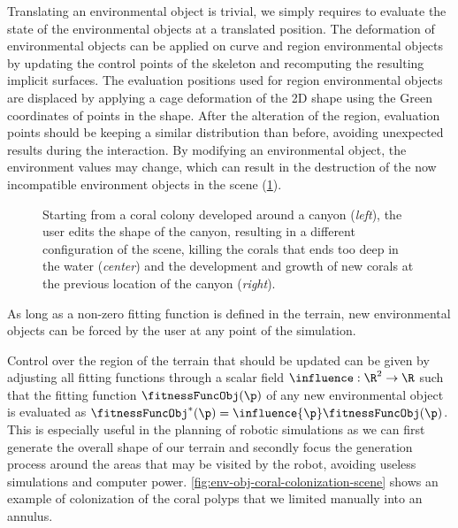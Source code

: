 Translating an environmental object is trivial, we simply requires to evaluate the state of the environmental objects at a translated position. The deformation of environmental objects can be applied on curve and region environmental objects by updating the control points of the skeleton and recomputing the resulting implicit surfaces. The evaluation positions used for region environmental objects are displaced by applying a cage deformation of the 2D shape using the Green coordinates of points in the shape. After the alteration of the region, evaluation points should be keeping a similar distribution than before, avoiding unexpected results during the interaction.
By modifying an environmental object, the environment values may change, which can result in the destruction of the now incompatible environment objects in the scene (\cref{fig:env-obj-user-interaction}).

\begin{figure}
    \caption{Starting from a coral colony developed around a canyon (\textit{left}), the user edits the shape of the canyon, resulting in a different configuration of the scene, killing the corals that ends too deep in the water (\textit{center}) and the development and growth of new corals at the previous location of the canyon (\textit{right}). }
    \label{fig:env-obj-user-interaction}
\end{figure}

As long as a non-zero fitting function is defined in the terrain, new environmental objects can be forced by the user at any point of the simulation. 

Control over the region of the terrain that should be updated can be given by adjusting all fitting functions through a scalar field $\influence: \R^2 \to \R $ such that the fitting function $\fitnessFuncObj(\p)$ of any new environmental object is evaluated as $\fitnessFuncObj^*(\p) = \influence{\p} \fitnessFuncObj(\p)$. This is especially useful in the planning of robotic simulations as we can first generate the overall shape of our terrain and secondly focus the generation process around the areas that may be visited by the robot, avoiding useless simulations and computer power. 
\cref{fig:env-obj-coral-colonization-scene} shows an example of colonization of the coral polyps that we limited manually into an annulus.

